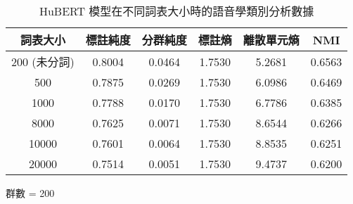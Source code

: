 \begin{table}[!htbp]
            \jefftablesep        

            \begin{subtable}[t]{\textwidth}
                \centering
                \begin{tabular}{|c|c|c|c|c|c|} \hline 
                        詞表大小  & 標註純度 & 分群純度 & 標註熵 & 離散單元熵 &     NMI   \\ \hline 
 200 (未分詞)&              0.8004 &   0.0464 &         1.7530 &     5.2681 &  0.6563\\ \hline 
                           500    &  0.7875  &  0.0269  & 1.7530 &  6.0986  &     0.6469  \\ \hline 
                          1000    &  0.7788  &  0.0170  & 1.7530 &  6.7786  &     0.6385  \\ \hline 
                          8000    &  0.7625  &  0.0071  & 1.7530 &  8.6544  &     0.6266  \\ \hline 
                         10000    &  0.7601  &  0.0064  & 1.7530 &  8.8535  &     0.6251  \\ \hline 
                         20000    &  0.7514  &  0.0051  & 1.7530 &  9.4737  &     0.6200   \\ \hline
                \end{tabular}
\caption{群數 = 200}
                \label{tab:ch4-hubert-pcls-clu200}
            \end{subtable}        

\caption{HuBERT 模型在不同詞表大小時的語音學類別分析數據}
            \label{tab:hubert-pcls-results}
        \end{table}

